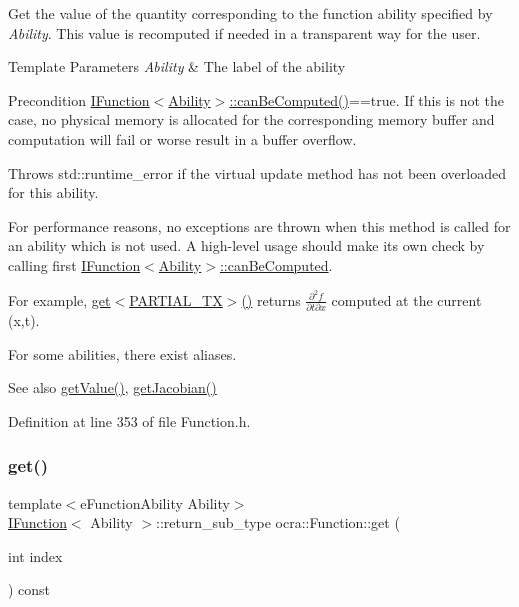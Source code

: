 Get the value of the quantity corresponding to the function ability specified by {\itshape Ability}. This value is recomputed if needed in a transparent way for the user.


\begin{DoxyTemplParams}{Template Parameters}
{\em Ability} & The label of the ability\\
\hline
\end{DoxyTemplParams}
\begin{DoxyPrecond}{Precondition}
\hyperlink{classocra_1_1IFunction_a18703c0b7573f9a1629236c9e10150d9}{I\+Function$<$\+Ability$>$\+::can\+Be\+Computed()}==true. If this is not the case, no physical memory is allocated for the corresponding memory buffer and computation will fail or worse result in a buffer overflow.
\end{DoxyPrecond}
Throws std\+::runtime\+\_\+error if the virtual update method has not been overloaded for this ability.

For performance reasons, no exceptions are thrown when this method is called for an ability which is not used. A high-\/level usage should make its own check by calling first {\ttfamily \hyperlink{classocra_1_1IFunction_a18703c0b7573f9a1629236c9e10150d9}{I\+Function$<$\+Ability$>$\+::can\+Be\+Computed}}.

For example, \hyperlink{classocra_1_1Function_a244404069d9ab169fbb23309785693b8}{get$<$\+P\+A\+R\+T\+I\+A\+L\+\_\+\+T\+X$>$()} returns $ \frac{\partial^2 f}{\partial t \partial x}$ computed at the current (x,t).

For some abilities, there exist aliases. \begin{DoxySeeAlso}{See also}
\hyperlink{classocra_1_1Function_a0b8c9f91088218ca55e73679e8c56e87}{get\+Value()}, \hyperlink{classocra_1_1Function_a14d855bebcf8a03878c0ff7857b27d37}{get\+Jacobian()} 
\end{DoxySeeAlso}


Definition at line 353 of file Function.\+h.

\hypertarget{classocra_1_1Function_add7bf02dbd416bd2f9fab547566fc6ed}{}\label{classocra_1_1Function_add7bf02dbd416bd2f9fab547566fc6ed} 
\subsubsection{\texorpdfstring{get()}{get()}\hspace{0.1cm}{\footnotesize\ttfamily [2/2]}}
{\footnotesize\ttfamily template$<$e\+Function\+Ability Ability$>$ \\
\hyperlink{classocra_1_1IFunction}{I\+Function}$<$ Ability $>$\+::return\+\_\+sub\+\_\+type ocra\+::\+Function\+::get (\begin{DoxyParamCaption}\item[{int}]{index }\end{DoxyParamCaption}) const\hspace{0.3cm}{\ttfamily [inline]}}

